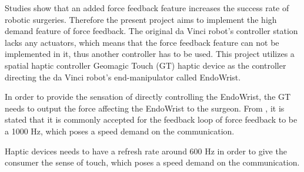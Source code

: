 Studies show that an added force feedback feature increases the success rate of robotic surgeries\cite{lack_fb}. Therefore the present project aims to implement the high demand feature of force feedback. The original da Vinci robot's controller station lacks any actuators, which means that the force feedback feature can not be implemented in it, thus another controller has to be used. This project utilizes a spatial haptic controller Geomagic Touch (GT) haptic device as the controller directing the da Vinci robot's end-manipulator called EndoWrist. 







In order to provide the sensation of directly controlling the EndoWrist, the GT needs to output the force affecting the EndoWrist to the surgeon. 
{\color{green}
From \cite{coles2011role}, it is stated that it is commonly accepted for the feedback loop of force feedback to be a 1000 Hz, which poses a speed demand on the communication.
}

{\color{red} 
Haptic devices needs to have a refresh rate around 600 Hz in order to give the consumer the sense of touch\cite{coles2011role}, which poses a speed demand on the communication.}%

